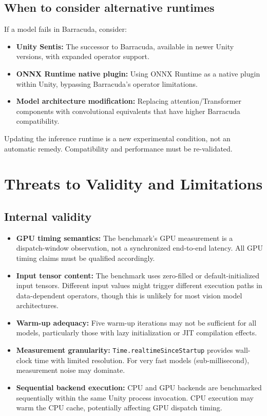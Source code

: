 \documentclass[10pt,twocolumn,letterpaper]{article}
\begin{document}
\subsection{When to consider alternative runtimes}

If a model fails in Barracuda, consider:
\begin{itemize}[nosep,leftmargin=*]
  \item \textbf{Unity Sentis:} The successor to Barracuda, available in newer Unity versions, with expanded operator support.
  \item \textbf{ONNX Runtime native plugin:} Using ONNX Runtime as a native plugin within Unity, bypassing Barracuda's operator limitations.
  \item \textbf{Model architecture modification:} Replacing attention/Transformer components with convolutional equivalents that have higher Barracuda compatibility.
\end{itemize}

Updating the inference runtime is a new experimental condition, not an automatic remedy. Compatibility and performance must be re-validated.

\section{Threats to Validity and Limitations}\label{sec:limitations}

\subsection{Internal validity}

\begin{itemize}[nosep,leftmargin=*]
  \item \textbf{GPU timing semantics:} The benchmark's GPU measurement is a dispatch-window observation, not a synchronized end-to-end latency. All GPU timing claims must be qualified accordingly.
  \item \textbf{Input tensor content:} The benchmark uses zero-filled or default-initialized input tensors. Different input values might trigger different execution paths in data-dependent operators, though this is unlikely for most vision model architectures.
  \item \textbf{Warm-up adequacy:} Five warm-up iterations may not be sufficient for all models, particularly those with lazy initialization or JIT compilation effects.
  \item \textbf{Measurement granularity:} \texttt{Time.realtimeSinceStartup} provides wall-clock time with limited resolution. For very fast models (sub-millisecond), measurement noise may dominate.
  \item \textbf{Sequential backend execution:} CPU and GPU backends are benchmarked sequentially within the same Unity process invocation. CPU execution may warm the CPU cache, potentially affecting GPU dispatch timing.
\end{itemize}
\end{document}

